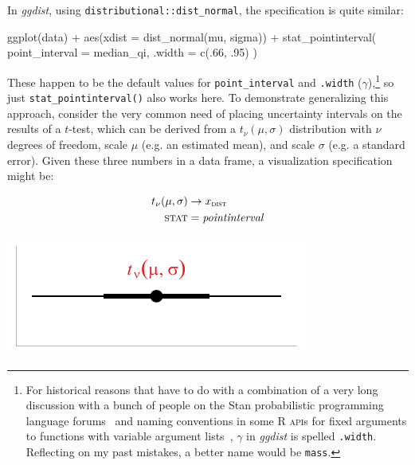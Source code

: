\documentclass[journal]{vgtc}                     %
\newenvironment{centerverbatim}{%
  \hfill\break
  \small
  \centering
  \varwidth{\linewidth}%
  \verbatim
}{%
  \endverbatim
  \endvarwidth
  \par
  \hfill\break
}
\begin{document}
In \textit{ggdist}, using \texttt{distributional::dist\_normal}, the specification is quite similar:

\begin{centerverbatim}
ggplot(data) +
  aes(xdist = dist_normal(mu, sigma)) +
  stat_pointinterval(
    point_interval = median_qi, 
    .width = c(.66, .95)
  )
\end{centerverbatim}

These happen to be the default values for \texttt{point\_interval} and \texttt{.width} ($\gamma$),\footnote{For historical reasons that have to do with a combination of a very long discussion with a bunch of people on the Stan probabilistic programming language forums~\cite{kay2018stannames} and naming conventions in some R \textsc{api}s for fixed arguments to functions with variable argument lists~\cite{tidyverse2020dotprefix}, $\gamma$ in \textit{ggdist} is spelled \texttt{.width}. Reflecting on my past mistakes, a better name would be  \texttt{mass}.} so just \texttt{stat\_pointinterval()}  also works here. To demonstrate generalizing this approach, consider the very common need of placing uncertainty intervals on the results of a $t$-test, which can be derived from a $t_\nu(\mu, \sigma)$  distribution with $\nu$ degrees of freedom, scale $\mu$ (e.g. an estimated mean), and scale $\sigma$ (e.g. a standard error). Given these three numbers in a data frame, a visualization specification might be:

\noindent
\begin{minipage}{.5\columnwidth}

\begin{align*}
t_{\nu}(\mu, \sigma) &\rightarrow x_\textsc{dist}\\
\textsc{stat} &= \mathit{pointinterval}
\end{align*}
\end{minipage}%
  \begin{minipage}{.4\columnwidth}
    \centering
    \includegraphics[width=1.2\columnwidth]{figs/3-stat_pointinterval_student_t.pdf}
  \end{minipage}
\hfill\break
\end{document}
